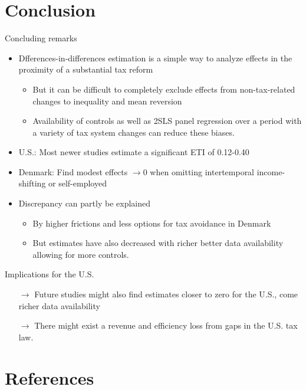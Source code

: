 \documentclass[8pt]{beamer}
\begin{document}
\section{Conclusion}


\begin{frame}{Concluding remarks}
  \begin{itemize}
    \item Dfferences-in-differences estimation is a simple way to analyze effects in the proximity of a substantial tax reform
    \begin{itemize}
      \item But it can be difficult to completely exclude effects from non-tax-related changes to inequality and mean reversion
      \item Availability of controls as well as 2SLS panel regression over a period with a variety of tax system changes can reduce these biases.
    \end{itemize}
    \item U.S.: Most newer studies estimate a significant ETI of 0.12-0.40
    \item Denmark: Find modest effects $\rightarrow 0$ when omitting intertemporal income-shifting or self-employed
    \item Discrepancy can partly be explained
    \begin{itemize}
      \item By higher frictions and less options for tax avoidance in Denmark
      \item But estimates have also decreased with richer better data availability allowing for more controls.
    \end{itemize}
  \end{itemize}
  Implications for the U.S.
  \begin{itemize}
    \item[$\rightarrow$] Future studies might also find estimates closer to zero for the U.S., come richer data availability
    \item[$\rightarrow$] There might exist a revenue and efficiency loss from gaps in the U.S. tax law.
  \end{itemize}



\end{frame}


\section{References}
\begin{frame}%
  \printbibliography
\end{frame}

\end{document}
